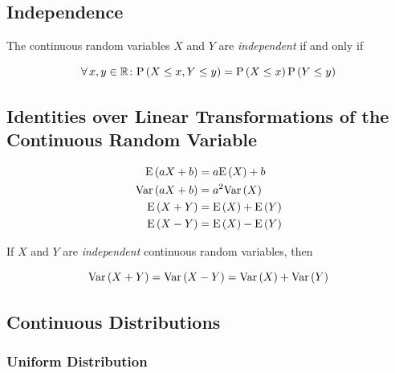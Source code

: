 \subsection{Independence}

\begin{definition}
    The continuous random variables $X$ and $Y$ are \textit{independent} if and only if
    
    \begin{equation}
        \operatorname{\forall} x, y \in \mathbb{R} \colon \mathrm{P} \left( X \le x, Y \le y \right) = \mathrm{P} \left( X \le x \right) \mathrm{P} \left( Y \le y \right)
    \end{equation}
\end{definition}

\subsection{Identities over Linear Transformations of the Continuous Random Variable}

\begin{align}
    \mathrm{E} \left( a X + b \right) &= a \mathrm{E} \left( X \right) + b \\
    \mathrm{Var} \left( a X + b \right) &= a^2 \mathrm{Var} \left( X \right) \\
    \mathrm{E} \left( X + Y \right) &= \mathrm{E} \left( X \right) + \mathrm{E} \left( Y \right) \\
    \mathrm{E} \left( X - Y \right) &= \mathrm{E} \left( X \right) - \mathrm{E} \left( Y \right)
\end{align}

If $X$ and $Y$ are \textit{independent} continuous random variables, then

\begin{equation}
    \mathrm{Var} \left( X + Y \right) = \mathrm{Var} \left( X - Y \right) = \mathrm{Var} \left( X \right) + \mathrm{Var} \left( Y \right)
\end{equation}

\subsection{Continuous Distributions}

\subsubsection{Uniform Distribution}


